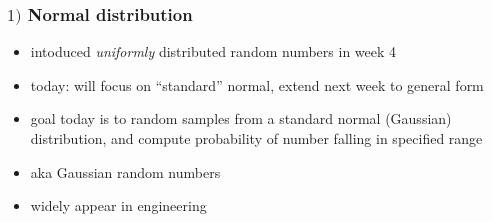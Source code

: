 \documentclass[english,14pt]{beamer}
\begin{document}
%
%
%
%

%
%
%
%

%
%
%
%


\begin{frame}[fragile]

\frametitle{$1)$ Normal distribution}

\begin{itemize}
	\item intoduced \emph{uniformly} distributed random numbers in week 4
	\item today: will focus on ``standard'' normal, extend next week to general form
	\item goal today is to random samples from a standard normal (Gaussian) distribution, and compute probability of number falling in specified range
	\item aka Gaussian random numbers
	\item widely appear in engineering
\end{itemize}

\end{frame}
\end{document}
